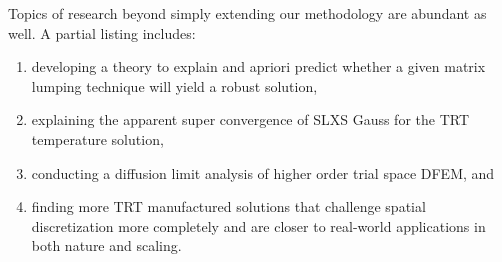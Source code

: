 Topics of research beyond simply extending our methodology are abundant as well.
A partial listing includes:
\begin{enumerate}
\item developing a theory to explain and apriori predict whether a given matrix lumping technique will yield a robust solution,
\item explaining the apparent super convergence of SLXS Gauss for the TRT temperature solution, 
\item conducting a diffusion limit analysis of higher order trial space DFEM, and
\item finding more TRT manufactured solutions that challenge spatial discretization more completely and are closer to real-world applications in both nature and scaling.
\end{enumerate}
